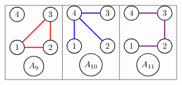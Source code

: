 \[
    \begin{array}{|l|l|l|}
    \hline
    \begin{tikzpicture}
[scale=.2]
\begin{scope}[every node/.style={circle,thick,draw}]
    \node (1) at (0,4) {1};
    \node (2) at (7,4) {2};
    \node (3) at (7,11) {3};
    \node (4) at (0,11) {4};
   \node(A) at (3.5,0) {$A_9$};
\end{scope}

\begin{scope}[%
              every node/.style={fill=white,circle},
              every edge/.style={draw=red,very thick}]
\draw (1) edge  (2);
     \draw (2) edge  (3);
     \draw (3) edge  (1);
     \end{scope}
\end{tikzpicture}
&
\begin{tikzpicture}
[scale=.2]
\begin{scope}[every node/.style={circle,thick,draw}]
    \node (1) at (0,4) {1};
    \node (2) at (7,4) {2};
    \node (3) at (7,11) {3};
    \node (4) at (0,11) {4};
   \node(A) at (3.5,0) {$A_{10}$};
\end{scope}

\begin{scope}[%
              every node/.style={fill=white,circle},
              every edge/.style={draw=blue,very thick}]
     \draw (3) edge  (4);
     \draw (4) edge  (1);
     \draw (4) edge  (2);
             
\end{scope}
\end{tikzpicture}
&
\begin{tikzpicture}
[scale=.2]
\begin{scope}[every node/.style={circle,thick,draw}]
    \node (1) at (0,4) {1};
    \node (2) at (7,4) {2};
    \node (3) at (7,11) {3};
    \node (4) at (0,11) {4};
   \node(A) at (3.5,0) {$A_{11}$};
\end{scope}

\begin{scope}[%
              every node/.style={fill=white,circle},
              every edge/.style={draw=violet,very thick}]
 \draw (1) edge  (2);
     \draw (2) edge  (3);
     \draw (3) edge  (4);
     \end{scope}
\end{tikzpicture}
\\
\hline

\end{array}
\]

